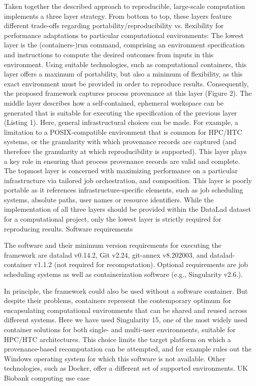 Taken together the described approach to reproducible, large-scale computation implements a three layer strategy. From bottom to top, these layers feature different trade-offs regarding portability/reproducibility vs. flexibility for performance adaptations to particular computational environments: The lowest layer is the (containers-)run command, comprising an environment specification and instructions to compute the desired outcomes from inputs in this environment. Using suitable technologies, such as computational containers, this layer offers a maximum of portability, but also a minimum of flexibility, as this exact environment must be provided in order to reproduce results. Consequently, the proposed framework captures process provenance at this layer (Figure 2). The middle layer describes how a self-contained, ephemeral workspace can be generated that is suitable for executing the specification of the previous layer (Listing 1). Here, general infrastructural choices can be made. For example, a limitation to a POSIX-compatible environment that is common for HPC/HTC systems, or the granularity with which provenance records are captured (and therefore the granularity at which reproducibility is supported). This layer plays a key role in ensuring that process provenance records are valid and complete. The topmost layer is concerned with maximizing performance on a particular infrastructure via tailored job orchestration, and composition. This layer is poorly portable as it references infrastructure-specific elements, such as job scheduling systems, absolute paths, user names or resource identifiers. While the implementation of all three layers should be provided within the DataLad dataset for a computational project, only the lowest layer is strictly required for reproducing results.
Software requirements

The software and their minimum version requirements for executing the framework are datalad v0.14.2, Git v2.24, git-annex v8.202003, and datalad-container v1.1.2 (not required for recomputation). Optional requirements are job scheduling systems as well as containerization software (e.g., Singularity v2.6.).

In principle, the framework could also be used without a software container. But despite their problems, containers represent the contemporary optimum for encapsulating computational environments that can be shared and reused across different systems. Here we have used Singularity 15, one of the most widely used container solutions for both single- and multi-user environments, suitable for HPC/HTC architectures. This choice limits the target platform on which a provenance-based recomputation can be attempted, and for example rules out the Windows operating system for which this software is not available. Other technologies, such as Docker, offer a different set of supported environments.
UK Biobank computing use case




